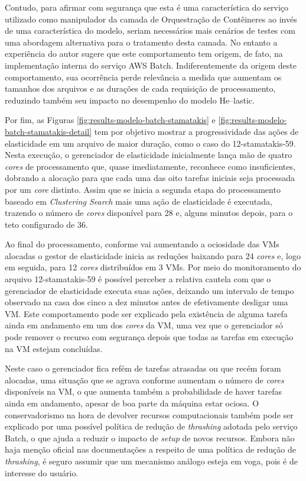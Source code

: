 \documentclass[english,brazilian]{UNISINOSmonografia} %
\begin{document}
Contudo, para afirmar com segurança que esta é uma característica do serviço utilizado como manipulador da camada de Orquestração de Contêineres ao invés de uma característica do modelo, seriam necessários mais cenários de testes com uma abordagem alternativa para o tratamento desta camada.
%
No entanto a experiência do autor sugere que este comportamento tem origem, de fato, na implementação interna do serviço AWS Batch.
%
Indiferentemente da origem deste comportamento, sua ocorrência perde relevância a medida que aumentam os tamanhos dos arquivos e as durações de cada requisição de processamento, reduzindo também seu impacto no desempenho do modelo \textsf{He}--lastic.


Por fim, as Figuras \ref{fig:results-modelo-batch-stamatakis} e
\ref{fig:results-modelo-batch-stamatakis-detail} tem por objetivo mostrar a progressividade das ações de elasticidade em um arquivo de maior duração, como o caso do 12-stamatakis-59.
%
Nesta execução, o gerenciador de elasticidade inicialmente lança mão de quatro \textit{cores} de processamento que, quase imediatamente, reconhece como insuficientes, dobrando a alocação para que cada uma das oito tarefas iniciais seja processada por um \textit{core} distinto.
%
Assim que se inicia a segunda etapa do processamento baseado em \textit{Clustering Search} mais uma ação de elasticidade é executada, trazendo o número de \textit{cores} disponível para 28 e, alguns minutos depois, para o teto configurado de 36.



Ao final do processamento, conforme vai aumentando a ociosidade das VMs alocadas o gestor de elasticidade inicia as reduções baixando para 24 \textit{cores} e, logo em seguida, para 12 \textit{cores} distribuídos em 3 VMs.
%
Por meio do monitoramento do arquivo 12-stamatakis-59 é possível perceber a relativa cautela com que o gerenciador de elasticidade executa suas ações, deixando um intervalo de tempo observado na casa dos cinco a dez minutos antes de efetivamente desligar uma VM.
%
Este comportamento pode ser explicado pela existência de alguma tarefa ainda em andamento em um dos \textit{cores} da VM, uma vez que o gerenciador só pode remover o recurso com segurança depois que todas as tarefas em execução na VM estejam concluídas.


Neste caso o gerenciador fica refém de tarefas atrasadas ou que recém foram alocadas, uma situação que se agrava conforme aumentam o número de \textit{cores} disponíveis na VM, o que aumenta também a probabilidade de haver tarefas ainda em andamento, apesar de boa parte da máquina estar ociosa.
%
O conservadorismo na hora de devolver recursos computacionais também pode ser explicado por uma possível política de redução de \textit{thrashing} adotada pelo serviço Batch, o que ajuda a reduzir o impacto de \textit{setup} de novos recursos.
%
Embora não haja menção oficial nas documentações a respeito de uma política de redução de \textit{thrashing}, é seguro assumir que um mecanismo análogo esteja em voga, pois é de interesse do usuário.
\end{document}
